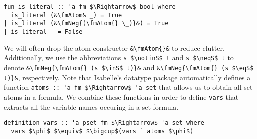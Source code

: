 \documentclass[sigplan,10pt,anonymous,review]{acmart}
\newcommand{\inS}{\in_\text{s}}
\newcommand{\notinS}{\notin_\text{s}}
\newcommand{\eqS}{=_\text{s}}
\newcommand{\neqS}{\neq_\text{s}}
\newcommand{\fmNegSymbol}{\boldsymbol{\neg}}
\newcommand{\fmNeg}[1]{$\fmNegSymbol$ #1}
\newcommand{\fmAtom}{\textbf{A}}
\begin{document}
\begin{lstlisting}
fun is_literal :: 'a fm $\Rightarrow$ bool where
  is_literal (&\fmAtom& _) = True
| is_literal (&\fmNeg{(\fmAtom{} \_)}&) = True
| is_literal _ = False
\end{lstlisting}
We will often drop the atom constructor \lstinline!&\fmAtom{}&! to reduce clutter.
Additionally, we use the abbreviations \lstinline!s $\notinS$ t! and \lstinline!s $\neqS$ t! to denote \lstinline!&\fmNeg{\fmAtom{} (s $\inS$ t)}&! and \lstinline!&\fmNeg{\fmAtom{} (s $\eqS$ t)}&!, respectively.
Note that Isabelle's datatype package automatically defines a function \lstinline!atoms :: 'a fm $\Rightarrow$ 'a set! that allows us to obtain all set atoms in a formula.
We combine these functions in order to define \lstinline!vars! that extracts all the variable names occuring in a set formula.
\begin{lstlisting}
definition vars :: 'a pset_fm $\Rightarrow$ 'a set where
  vars $\phi$ $\equiv$ $\bigcup$(vars ` atoms $\phi$)
\end{lstlisting}
\end{document}
